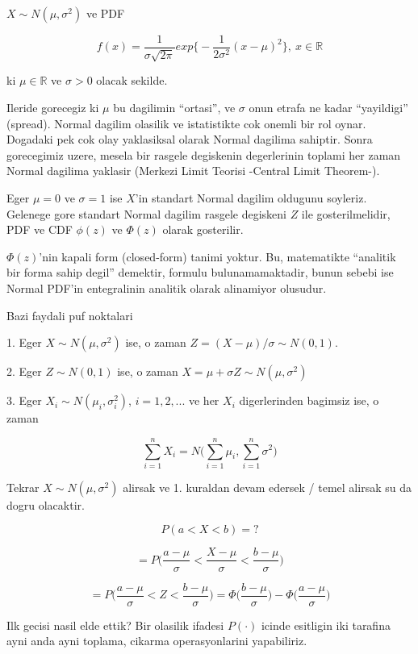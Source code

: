 \documentclass[12pt,fleqn]{article}\usepackage{../common}
\begin{document}
$X \sim N(\mu, \sigma^2)$ ve PDF

\[ f(x) = \frac{1}{\sigma\sqrt{2\pi}} 
exp \bigg\{ - \frac{1}{2\sigma^2}(x-\mu)^2  \bigg\}
, \ x \in \mathbb{R}
\]

ki $\mu \in \mathbb{R}$ ve $\sigma > 0$ olacak sekilde.

Ileride gorecegiz ki $\mu$ bu dagilimin ``ortasi'', ve $\sigma$ onun
etrafa ne kadar ``yayildigi'' (spread). Normal dagilim olasilik ve
istatistikte cok onemli bir rol oynar. Dogadaki pek cok olay
yaklasiksal olarak Normal dagilima sahiptir. Sonra gorecegimiz uzere,
mesela bir rasgele degiskenin degerlerinin toplami her zaman Normal
dagilima yaklasir (Merkezi Limit Teorisi -Central Limit Theorem-). 

Eger $\mu = 0$ ve $\sigma = 1$ ise $X$'in standart Normal dagilim oldugunu
soyleriz. Gelenege gore standart Normal dagilim rasgele degiskeni $Z$ ile
gosterilmelidir, PDF ve CDF $\phi(z)$ ve $\Phi(z)$ olarak gosterilir. 

$\Phi(z)$'nin kapali form (closed-form) tanimi yoktur. Bu, matematikte
``analitik bir forma sahip degil'' demektir, formulu bulunamamaktadir,
bunun sebebi ise Normal PDF'in entegralinin analitik olarak alinamiyor
olusudur. 

Bazi faydali puf noktalari

1. Eger $X \sim N(\mu, \sigma^2)$ ise, o zaman $Z = (X-\mu) / \sigma \sim
N(0,1)$. 

2. Eger $Z \sim N(0,1)$ ise, o zaman $X = \mu + \sigma Z \sim N(\mu,\sigma^2)$

3. Eger $X_i \sim N(\mu_i, \sigma_i^2)$, $i=1,2,...$ ve her $X_i$
digerlerinden bagimsiz ise, o zaman 

\[ \sum_{i=1}^n X_i = N\bigg( \sum_{i=1}^n\mu_i, \sum_{i=1}^n\sigma^2 \bigg) \]

Tekrar $X \sim N(\mu, \sigma^2)$ alirsak ve 1. kuraldan devam edersek /
temel alirsak su da dogru olacaktir. 

\[ P(a < X < b) = ? \]

\[ 
= P\bigg(
\frac{a-\mu}{\sigma} < 
\frac{X-\mu}{\sigma} < 
\frac{b-\mu}{\sigma}
\bigg) 
\]

\[
= P\bigg(\frac{a-\mu}{\sigma} < Z < \frac{b-\mu}{\sigma}\bigg) 
= 
\Phi\bigg(\frac{b-\mu}{\sigma}\bigg) - 
\Phi\bigg(\frac{a-\mu}{\sigma}\bigg) 
\]

Ilk gecisi nasil elde ettik? Bir olasilik ifadesi $P(\cdot)$ icinde esitligin iki
tarafina ayni anda ayni toplama, cikarma operasyonlarini yapabiliriz. 
\end{document}
